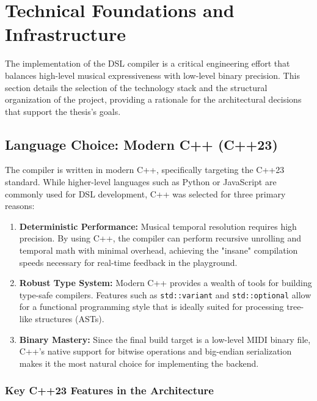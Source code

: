 \section{Technical Foundations and Infrastructure}\label{sec:implementation-foundations}

The implementation of the DSL compiler is a critical engineering effort that balances high-level musical expressiveness with low-level binary precision.
This section details the selection of the technology stack and the structural organization of the project, providing a rationale for the architectural decisions that support the thesis's goals.

\subsection{Language Choice: Modern C++ (C++23)}

The compiler is written in modern C++, specifically targeting the C++23 standard.
While higher-level languages such as Python or JavaScript are commonly used for DSL development, C++ was selected for three primary reasons:
\begin{enumerate}
    \item \textbf{Deterministic Performance:} Musical temporal resolution requires high precision. By using C++, the compiler can perform recursive unrolling and temporal math with minimal overhead, achieving the "insane" compilation speeds necessary for real-time feedback in the playground.
    \item \textbf{Robust Type System:} Modern C++ provides a wealth of tools for building type-safe compilers. Features such as \texttt{std::variant} and \texttt{std::optional} allow for a functional programming style that is ideally suited for processing tree-like structures (ASTs).
    \item \textbf{Binary Mastery:} Since the final build target is a low-level MIDI binary file, C++'s native support for bitwise operations and big-endian serialization makes it the most natural choice for implementing the backend.
\end{enumerate}

\subsubsection{Key C++23 Features in the Architecture}

